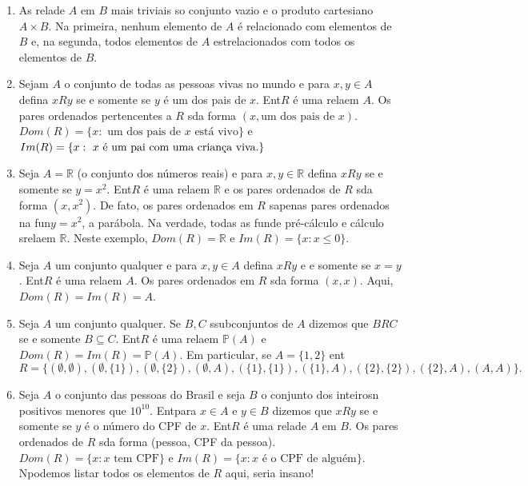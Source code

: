 \begin{enumerate}[{\bf 1.}]

\item As rela\coes de $A$ em $B$ mais triviais s\ao o conjunto vazio e o produto cartesiano $A\times B$. Na primeira, nenhum elemento de $A$ \'e relacionado com elementos de $B$ e, na segunda, todos elementos de $A$ est\ao relacionados com todos os elementos de $B$. 

\item\label{relex1} Sejam $A$ o conjunto de todas as pessoas vivas no mundo e para $x,y\in A$ defina $xRy$ se e somente se $y$ \'e um dos pais de $x$. Ent\ao $R$ \'e uma rela\cao em $A$. Os pares ordenados pertencentes a $R$ s\ao da forma $(x,\textrm{um dos pais de $x$})$. $Dom(R)=\{x: \textrm{ um dos pais de $x$ est\'a vivo}\}$ e $Im(R)=\{x: \textrm{ $x$ \'e um pai com uma crian\cc a viva.}\}$  

\item\label{relex2} Seja $A=\mathbb{R}$ (o conjunto dos n\'umeros reais) e para $x,y\in \mathbb{R}$ defina $xRy$ se e somente se $y=x^2$. Ent\ao $R$ \'e uma rela\cao em $\mathbb{R}$ e os pares ordenados de $R$ s\ao da forma $(x,x^2)$. De fato, os pares ordenados em $R$ s\ao apenas pares ordenados na fun\cao $y=x^2$, a par\'abola. Na verdade, todas as fun\coes de pr\'e-c\'alculo e c\'alculo s\ao rela\coes em $\mathbb{R}$. Neste exemplo, $Dom(R)=\mathbb{R}$ e $Im(R)=\{x: x\leq 0\}$.

\item\label{relex3} Seja $A$ um conjunto qualquer e para $x,y\in A$ defina $xRy$ e e somente se $x=y$. Ent\ao $R$ \'e uma rela\cao em $A$. Os pares ordenados em $R$ s\ao da forma $(x,x)$. Aqui, $Dom(R)=Im(R)=A$.

\item\label{relex4} Seja $A$ um conjunto qualquer. Se $B,C$ s\ao subconjuntos de $A$ dizemos que $BRC$ se e somente $B\subseteq C$. Ent\ao $R$ \'e uma rela\cao em $\mathbb{P}(A)$ e $Dom(R)=Im(R)=\mathbb{P}(A)$. Em particular, se $A=\{1,2\}$ ent\ao
\[
R=\{(\emptyset,\emptyset),(\emptyset,\{1\}),(\emptyset,\{2\}),(\emptyset,A),(\{1\},\{1\}),(\{1\},A),(\{2\},\{2\}),(\{2\},A),(A,A)\}.
\]

\item\label{relex5} Seja $A$ o conjunto das pessoas do Brasil e seja $B$ o conjunto dos inteirosn positivos menores que $10^{10}$. Ent\ao para $x\in A$ e $y\in B$ dizemos que $xRy$ se e somente se $y$ \'e o n\'umero do CPF de $x$. Ent\ao $R$ \'e uma rela\cao de $A$ em $B$. Os pares ordenados de $R$ s\ao da forma (pessoa, CPF da pessoa).  $Dom(R)=\{x: x \textrm{ tem CPF}\}$ e $Im(R)=\{x: x \textrm{ \'e o CPF de algu\'em}\}$. N\ao podemos listar todos os elementos de $R$ aqui, seria insano!


\end{enumerate}
